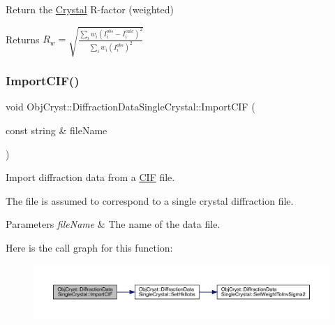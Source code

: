 Return the \mbox{\hyperlink{class_obj_cryst_1_1_crystal}{Crystal}} R-\/factor (weighted) 

\begin{DoxyReturn}{Returns}
$ R_{w}= \sqrt {\frac{\sum_i w_i\left( I_i^{obs}-I_i^{calc} \right)^2} {\sum_i w_i (I_i^{obs})^2} }$ 
\end{DoxyReturn}
\mbox{\label{class_obj_cryst_1_1_diffraction_data_single_crystal_ad3528e9815e774d0a442fe231434ed05}} 
\subsubsection{\texorpdfstring{ImportCIF()}{ImportCIF()}}
{\footnotesize\ttfamily void Obj\+Cryst\+::\+Diffraction\+Data\+Single\+Crystal\+::\+Import\+C\+IF (\begin{DoxyParamCaption}\item[{const string \&}]{file\+Name }\end{DoxyParamCaption})}



Import diffraction data from a \mbox{\hyperlink{class_obj_cryst_1_1_c_i_f}{C\+IF}} file. 

The file is assumed to correspond to a single crystal diffraction file. 
\begin{DoxyParams}{Parameters}
{\em file\+Name} & The name of the data file. \\
\hline
\end{DoxyParams}
Here is the call graph for this function\+:
\nopagebreak
\begin{figure}[H]
\begin{center}
\leavevmode
\includegraphics[width=350pt]{class_obj_cryst_1_1_diffraction_data_single_crystal_ad3528e9815e774d0a442fe231434ed05_cgraph}
\end{center}
\end{figure}
\mbox{\label{class_obj_cryst_1_1_diffraction_data_single_crystal_ac306439389c8eab225dd8dd87aa8f189}} 

